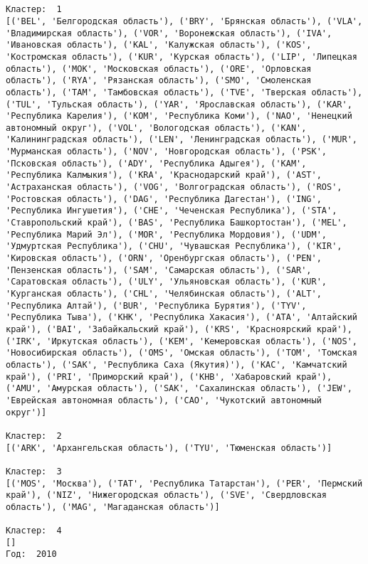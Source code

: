 \documentclass[11pt]{article}
\begin{document}
    \begin{center}
    \end{center}
    { \hspace*{\fill} \\}
    
    \begin{Verbatim}[commandchars=\\\{\}]

Кластер:  1
[('BEL', 'Белгородская область'), ('BRY', 'Брянская область'), ('VLA', 'Владимирская область'), ('VOR', 'Воронежская область'), ('IVA', 'Ивановская область'), ('KAL', 'Калужская область'), ('KOS', 'Костромская область'), ('KUR', 'Курская область'), ('LIP', 'Липецкая область'), ('MOK', 'Московская область'), ('ORE', 'Орловская область'), ('RYA', 'Рязанская область'), ('SMO', 'Смоленская область'), ('TAM', 'Тамбовская область'), ('TVE', 'Тверская область'), ('TUL', 'Тульская область'), ('YAR', 'Ярославская область'), ('KAR', 'Республика Карелия'), ('KOM', 'Республика Коми'), ('NAO', 'Ненецкий автономный округ'), ('VOL', 'Вологодская область'), ('KAN', 'Калинингpадская область'), ('LEN', 'Ленинградская область'), ('MUR', 'Мурманская область'), ('NOV', 'Новгородская область'), ('PSK', 'Псковская область'), ('ADY', 'Республика Адыгея'), ('KAM', 'Республика Калмыкия'), ('KRA', 'Краснодарский край'), ('AST', 'Астраханская область'), ('VOG', 'Волгоградская область'), ('ROS', 'Ростовская область'), ('DAG', 'Республика Дагестан'), ('ING', 'Республика Ингушетия'), ('CHE', 'Чеченская Республика'), ('STA', 'Ставропольский край'), ('BAS', 'Республика Башкортостан'), ('MEL', 'Республика Марий Эл'), ('MOR', 'Республика Мордовия'), ('UDM', 'Удмуртская Республика'), ('CHU', 'Чувашская Республика'), ('KIR', 'Кировская область'), ('ORN', 'Оренбургская область'), ('PEN', 'Пензенская область'), ('SAM', 'Самарская область'), ('SAR', 'Саратовская область'), ('ULY', 'Ульяновская область'), ('KUR', 'Курганская область'), ('CHL', 'Челябинская область'), ('ALT', 'Республика Алтай'), ('BUR', 'Республика Бурятия'), ('TYV', 'Республика Тыва'), ('KHK', 'Республика Хакасия'), ('ATA', 'Алтайский край'), ('BAI', 'Забайкальский край'), ('KRS', 'Красноярский край'), ('IRK', 'Иркутская область'), ('KEM', 'Кемеровская область'), ('NOS', 'Новосибирская область'), ('OMS', 'Омская область'), ('TOM', 'Томская область'), ('SAK', 'Республика Саха (Якутия)'), ('KAC', 'Камчатский край'), ('PRI', 'Приморский край'), ('KHB', 'Хабаровский край'), ('AMU', 'Амурская область'), ('SAK', 'Сахалинская область'), ('JEW', 'Еврейская автономная область'), ('CAO', 'Чукотский автономный округ')]

Кластер:  2
[('ARK', 'Архангельская область'), ('TYU', 'Тюменская область')]

Кластер:  3
[('MOS', 'Москва'), ('TAT', 'Республика Татарстан'), ('PER', 'Пермский край'), ('NIZ', 'Нижегородская область'), ('SVE', 'Свердловская область'), ('MAG', 'Магаданская область')]

Кластер:  4
[]
Год:  2010

    \end{Verbatim}
\end{document}
